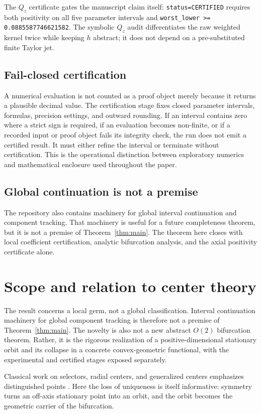 \documentclass[11pt]{article}
\begin{document}
The $Q_z$ certificate gates the manuscript claim itself: \texttt{status=CERTIFIED} requires both positivity on all five parameter intervals and \texttt{worst\_lower >= 0.0885587746621582}. The symbolic $Q_z$ audit differentiates the raw weighted kernel twice while keeping $h$ abstract; it does not depend on a pre-substituted finite Taylor jet.

\subsection{Fail-closed certification}
A numerical evaluation is not counted as a proof object merely because it returns a plausible decimal value. The certification stage fixes closed parameter intervals, formulas, precision settings, and outward rounding. If an interval contains zero where a strict sign is required, if an evaluation becomes non-finite, or if a recorded input or proof object fails its integrity check, the run does not emit a certified result. It must either refine the interval or terminate without certification. This is the operational distinction between exploratory numerics and mathematical enclosure used throughout the paper.

\subsection{Global continuation is not a premise}
The repository also contains machinery for global interval continuation and component tracking. That machinery is useful for a future completeness theorem, but it is not a premise of Theorem~\ref{thm:main}. The theorem here closes with local coefficient certification, analytic bifurcation analysis, and the axial positivity certificate alone.

\section{Scope and relation to center theory}
The result concerns a local germ, not a global classification. Interval continuation machinery for global component tracking is therefore not a premise of Theorem~\ref{thm:main}. The novelty is also not a new abstract $O(2)$ bifurcation theorem. Rather, it is the rigorous realization of a positive-dimensional stationary orbit and its collapse in a concrete convex-geometric functional, with the experimental and certified stages exposed separately.

Classical work on selectors, radial centers, and generalized centers emphasizes distinguished points \cite{HMP,Moszynska,OHara,Sakata}. Here the loss of uniqueness is itself informative: symmetry turns an off-axis stationary point into an orbit, and the orbit becomes the geometric carrier of the bifurcation.
\end{document}
